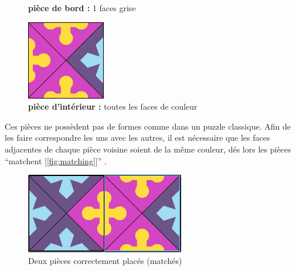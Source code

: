 \begin{figure}[H]
	   	\caption{\textbf{pièce de bord :} 1 faces grise}\label{fig:piece_bord}
	   	\endminipage\hfill
	   	\includegraphics[width=\linewidth]{images/piece_interieure.png}
	   	\caption{\textbf{pièce d'intérieur :} toutes les faces de couleur}\label{fig:piece_interieure}
	   	\endminipage
	\end{figure}

	Ces pièces ne possèdent pas de formes comme dans un puzzle classique. Afin de les faire correspondre les uns avec les autres, il est nécessaire que les faces adjacentes de chaque pièce voisine soient de la même couleur, dés lors les pièces \enquote{matchent [\autoref{fig:matching}]} .
	
	\begin{figure}[H]
		\centering
		\includegraphics{images/matching_pieces.png}
		\caption{Deux pièces correctement placés (matchés)}\label{fig:matching}
	\end{figure}
	
